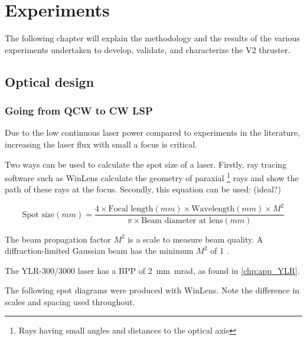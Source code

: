 \chapter{Experiments}

    The following chapter will explain the methodology and the results of the various experiments undertaken to develop, validate, and characterize the V2 thruster.

    \section{Optical design}

        \subsection{Going from QCW to CW LSP}
                
            Due to the low continuous laser power compared to experiments in the literature, increasing the laser flux with small a focus is critical.

            Two ways can be used to calculate the spot size of a laser. Firstly, ray tracing software such as WinLens calculate the geometry of paraxial \footnote{Rays having small angles and distances to the optical axis} rays and show the path of these rays at the focus. Secondly, this equation \cite{LaserSpotSize} can be used: (ideal?)
            
            \[
            \text{Spot size}(mm) = \frac{4 \times \text{Focal length}(mm) \times \text{Wavelength}(mm) \times M^2}{\pi \times \text{Beam diameter at lens}(mm)}
            \]

            The beam propagation factor $M^2$ is a scale to measure beam quality. A diffraction-limited Gaussian beam has the minimum $M^2$ of 1 \cite{hechtUnderstandingLasersEntry2019}. 
            
            The YLR-300/3000 laser has a BPP of \qty{2}{mm.mrad}, as found in \autoref{chp:app_YLR}.

            The following spot diagrams were produced with WinLens. Note the difference in scales and spacing used throughout.

